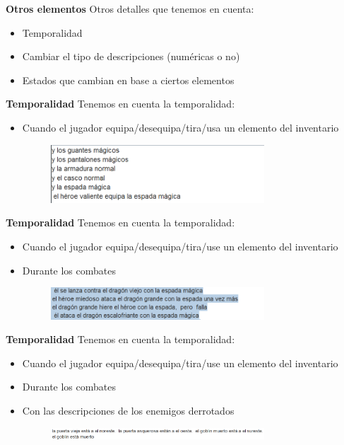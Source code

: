\begin{tframe}{\textbf{Otros elementos}}
	Otros detalles que tenemos en cuenta:
	\begin{itemize}
		\item<+-| alert@+> Temporalidad
		\item Cambiar el tipo de descripciones (numéricas o no)
		\item Estados que cambian en base a ciertos elementos
	\end{itemize}
\end{tframe}

\begin{tframe}{\textbf{Temporalidad}}
	Tenemos en cuenta la temporalidad:
	\begin{itemize}
		\item<+-| alert@+> Cuando el jugador equipa/desequipa/tira/usa un elemento del inventario
		\begin{figure}[h]
			\includegraphics[width=8cm]{../img/temporalidadEquipar.PNG}
		\end{figure}
	\end{itemize}
\end{tframe}

\begin{tframe}{\textbf{Temporalidad}}
	Tenemos en cuenta la temporalidad:
	\begin{itemize}
		\item Cuando el jugador equipa/desequipa/tira/use un elemento del inventario
		\item<+-| alert@+> Durante los combates
		\begin{figure}[h]
			\includegraphics[width=8cm]{../img/temporalidadAtaque.PNG}
		\end{figure}
	\end{itemize}
\end{tframe}

\begin{tframe}{\textbf{Temporalidad}}
	Tenemos en cuenta la temporalidad:
	\begin{itemize}
		\item Cuando el jugador equipa/desequipa/tira/use un elemento del inventario
		\item Durante los combates
		\item<+-| alert@+> Con las descripciones de los enemigos derrotados
		\begin{figure}[h]
			\includegraphics[width=8cm]{../img/enemigosderrotados.PNG}
		\end{figure}
	\end{itemize}
\end{tframe}

